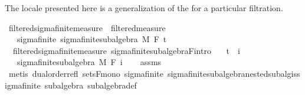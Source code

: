 \begin{isabellebody}
%
\isadelimdocument
%
\endisadelimdocument
%
\isatagdocument
%
\isamarkuptrue%
%
\endisatagdocument
{\isafolddocument}%
%
\isadelimdocument
%
\endisadelimdocument
%
\begin{isamarkuptext}%
The locale presented here is a generalization of the  for a particular filtration.%
\end{isamarkuptext}\isamarkuptrue%
\isamarkupfalse%
\ filtered{\isacharunderscore}{\kern0pt}sigma{\isacharunderscore}{\kern0pt}finite{\isacharunderscore}{\kern0pt}measure\ {\isacharequal}{\kern0pt}\ filtered{\isacharunderscore}{\kern0pt}measure\ {\isacharplus}{\kern0pt}\isanewline
\ \ \ sigma{\isacharunderscore}{\kern0pt}finite{\isacharcolon}{\kern0pt}\ {\isachardoublequoteopen}sigma{\isacharunderscore}{\kern0pt}finite{\isacharunderscore}{\kern0pt}subalgebra\ M\ {\isacharparenleft}{\kern0pt}F\ t\isanewline
\isanewline
{}\isamarkupfalse%
\ {\isacharparenleft}{\kern0pt}\ filtered{\isacharunderscore}{\kern0pt}sigma{\isacharunderscore}{\kern0pt}finite{\isacharunderscore}{\kern0pt}measure{\isacharparenright}{\kern0pt}\ sigma{\isacharunderscore}{\kern0pt}finite{\isacharunderscore}{\kern0pt}subalgebra{\isacharunderscore}{\kern0pt}F{\isacharbrackleft}{\kern0pt}intro{\isacharbrackright}{\kern0pt}{\isacharcolon}{\kern0pt}\isanewline
\ \ \ {\isachardoublequoteopen}t\ {\isasymle}\ i{\isachardoublequoteclose}\isanewline
\ \ \ {\isachardoublequoteopen}sigma{\isacharunderscore}{\kern0pt}finite{\isacharunderscore}{\kern0pt}subalgebra\ M\ {\isacharparenleft}{\kern0pt}F\ i{\isacharparenright}{\kern0pt}{\isachardoublequoteclose}\isanewline
%
\isadelimproof
\ \ %
\endisadelimproof
%
\isatagproof
{}\isamarkupfalse%
\ assms\ \isamarkupfalse%
\ {\isacharparenleft}{\kern0pt}metis\ dual{\isacharunderscore}{\kern0pt}order{\isachardot}{\kern0pt}refl\ sets{\isacharunderscore}{\kern0pt}F{\isacharunderscore}{\kern0pt}mono\ sigma{\isacharunderscore}{\kern0pt}finite\ sigma{\isacharunderscore}{\kern0pt}finite{\isacharunderscore}{\kern0pt}subalgebra{\isachardot}{\kern0pt}nested{\isacharunderscore}{\kern0pt}subalg{\isacharunderscore}{\kern0pt}is{\isacharunderscore}{\kern0pt}sigma{\isacharunderscore}{\kern0pt}finite\ subalgebra\ subalgebra{\isacharunderscore}{\kern0pt}def{\isacharparenright}{\kern0pt}%

\end{isabellebody}
